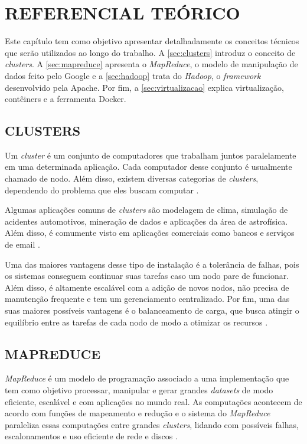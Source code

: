 \chapter{REFERENCIAL TEÓRICO} \label{cha:refteorico}

Este capítulo tem como objetivo apresentar detalhadamente os conceitos técnicos que serão utilizados ao longo do trabalho. A \autoref{sec:clusters} introduz o conceito de \textit{clusters}. A \autoref{sec:mapreduce} apresenta o \textit{MapReduce}, o modelo de manipulação de dados feito pelo Google e a \autoref{sec:hadoop} trata do \textit{Hadoop}, o \textit{\gls{framework}} desenvolvido pela Apache. Por fim, a \autoref{sec:virtualizacao} explica virtualização, contêiners e a ferramenta Docker.

\section{CLUSTERS} \label{sec:clusters}

Um \textit{cluster} é um conjunto de computadores que trabalham juntos paralelamente em uma determinada aplicação. Cada computador desse conjunto é usualmente chamado de nodo. Além disso, existem diversas categorias de \textit{clusters}, dependendo do problema que eles buscam computar \cite{GoldmanApache12}.

Algumas aplicações comuns de \textit{clusters} são modelagem de clima, simulação de acidentes automotivos, mineração de dados e aplicações da área de astrofísica. Além disso, é comumente visto em aplicações comerciais como bancos e serviços de email \cite{ClusterGridCloudComparison11}.

Uma das maiores vantagens desse tipo de instalação é a tolerância de falhas, pois os sistemas conseguem continuar suas tarefas caso um nodo pare de funcionar. Além disso, é altamente escalável com a adição de novos nodos, não precisa de manutenção frequente e tem um gerenciamento centralizado. Por fim, uma das suas maiores possíveis vantagens é o balanceamento de carga, que busca atingir o equilíbrio entre as tarefas de cada nodo de modo a otimizar os recursos \cite{ClusterGridCloudComparison11}.

\section{MAPREDUCE} \label{sec:mapreduce}

\textit{MapReduce} é um modelo de programação associado a uma implementação que tem como objetivo processar, manipular e gerar grandes \textit{datasets} de modo eficiente, escalável e com aplicações no mundo real. As computações acontecem de acordo com funções de mapeamento e redução e o sistema do \textit{MapReduce} paraleliza essas computações entre grandes \textit{clusters}, lidando com possíveis falhas, escalonamentos e uso eficiente de rede e discos \cite{MapReduce08}.

